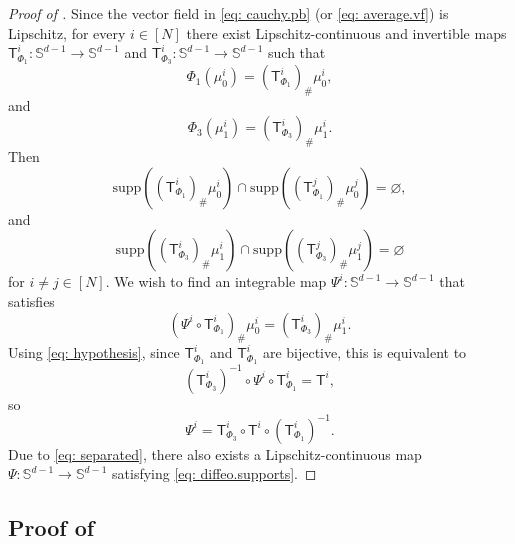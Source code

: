 \documentclass[a4paper,11pt]{article}
\theoremstyle{plain}
\newcommand{\supp}{\mathrm{supp}}
\renewcommand{\S}{\mathbb{S}^{d-1}}
\numberwithin{equation}{section}
\begin{document}
\begin{proof}[Proof of ]  
Since the vector field in \eqref{eq: cauchy.pb} (or \eqref{eq: average.vf}) is Lipschitz, for every $i\in[N]$ there exist  Lipschitz-continuous and invertible maps $\mathsf{T}^i_{\Phi_1}:\S\to\S$ and $\mathsf{T}^i_{\Phi_3}:\S\to\S$ such that
\begin{equation*}
    \Phi_1(\mu_0^i)=\left(\mathsf{T}^i_{\Phi_1}\right)_\#\mu_0^i,
\end{equation*}
and
\begin{equation*}
    \Phi_3(\mu_1^i)=\left(\mathsf{T}^i_{\Phi_3}\right)_\#\mu_1^i.
\end{equation*}
Then
\begin{equation}\label{eq: separated}
    \supp\left(\left(\mathsf{T}^i_{\Phi_1}\right)_\#\mu_0^i\right)\cap \supp\left(\left(\mathsf{T}^j_{\Phi_1}\right)_\#\mu_0^j\right)=\varnothing,
\end{equation}
and
\begin{equation*}
    \supp\left(\left(\mathsf{T}^i_{\Phi_3}\right)_\#\mu_1^i\right)\cap \supp\left(\left(\mathsf{T}^j_{\Phi_3}\right)_\#\mu_1^j\right)=\varnothing
\end{equation*}
for $i\neq j\in[N]$. We wish to find an integrable map $\Psi^i:\S\to\S$ that satisfies
\begin{equation*}
     \left(\Psi^i\circ\mathsf{T}^i_{\Phi_1}\right)_\#\mu_0^i= \left(\mathsf{T}^i_{\Phi_3}\right)_\#\mu_1^i.
\end{equation*}
Using \eqref{eq: hypothesis}, since $\mathsf{T}^i_{\Phi_1}$ and $\mathsf{T}^i_{\Phi_1}$ are bijective, this is equivalent to 
\begin{equation*}
    \left(\mathsf{T}^i_{\Phi_3}\right)^{-1}\circ\Psi^i\circ\mathsf{T}^i_{\Phi_1} =\mathsf{T}^i,
\end{equation*}
so
\begin{equation*}
\Psi^i=\mathsf{T}^i_{\Phi_3}\circ\mathsf{T}^i\circ\left(\mathsf{T}^i_{\Phi_1}\right)^{-1}.
\end{equation*}
Due to \eqref{eq: separated}, there also exists a Lipschitz-continuous map $\Psi:\S\to \S$ satisfying \eqref{eq: diffeo.supports}.
\end{proof}


\subsection{\texorpdfstring{Proof of }{Proof of Lemma}}
\label{proof: univ.approx}
\end{document}
